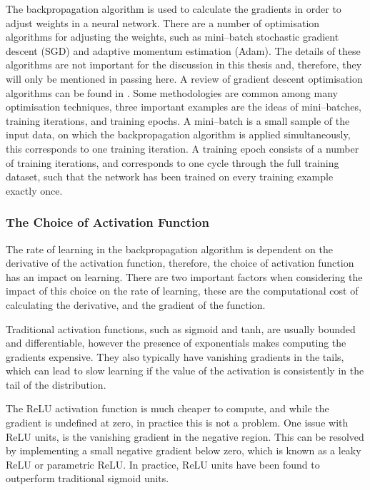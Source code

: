 \noindent
The backpropagation algorithm is used to calculate the gradients in order to
adjust weights in a neural network. There are a number of optimisation 
algorithms for adjusting the weights, such as mini--batch stochastic gradient 
descent (SGD)\cite{10.1145/2623330.2623612} and adaptive momentum estimation 
(Adam)\cite{KingmaD.P.2015AAMf}. The details of these algorithms are not 
important for the discussion in this thesis and, therefore, they will only be 
mentioned in passing here. A review of gradient descent optimisation 
algorithms can be found in \cite{ruder2016overview}. Some methodologies are 
common among many optimisation techniques, three important examples are the 
ideas of mini--batches, training iterations, and training epochs. A 
mini--batch is a small sample of the input data, on which the backpropagation 
algorithm is applied simultaneously, this corresponds to one training 
iteration. A training epoch consists of a number of training iterations, and 
corresponds to one cycle through the full training dataset, such that the 
network has been trained on every training example exactly once.

\subsubsection{The Choice of Activation Function}
The rate of learning in the backpropagation algorithm is dependent on the
derivative of the activation function, therefore, the choice of activation
function has an impact on learning. There are two important factors when
considering the impact of this choice on the rate of learning, these are the 
computational cost of calculating the derivative, and the gradient of the 
function. 

Traditional activation functions, such as sigmoid and tanh, are usually 
bounded and differentiable, however the presence of exponentials makes 
computing the gradients expensive. They also typically have vanishing 
gradients in the tails, which can lead to slow learning if the value of the 
activation is consistently in the tail of the distribution. 

The ReLU activation function is much cheaper to compute, and while the 
gradient is undefined at zero, in practice this is not a problem. One issue 
with ReLU units, is the vanishing gradient in the negative region. This can be 
resolved by implementing a small negative gradient below zero, which is known 
as a leaky ReLU or parametric ReLU\cite{He2015}. In practice, ReLU units have 
been found to outperform traditional sigmoid 
units\cite{Maas13rectifiernonlinearities, 10.5555/3104322.3104425}.

